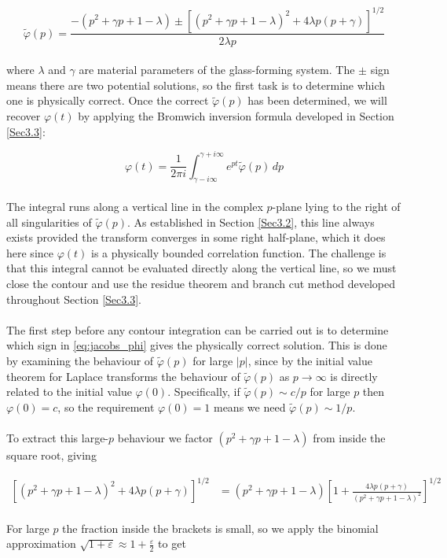 \begin{equation}
    \tilde{\varphi}(p) = \frac{-(p^2 + \gamma p + 1 - \lambda) \pm 
    \left[(p^2 + \gamma p + 1 - \lambda)^2 + 4\lambda p(p+\gamma)\right]^{1/2}}
    {2\lambda p}
    \label{eq:jacobs_phi}
\end{equation}
\\
where $\lambda$ and $\gamma$ are material parameters of the glass-forming system. 
The $\pm$ sign means there are two potential solutions, so the first task is to 
determine which one is physically correct. Once the correct $\tilde{\varphi}(p)$ 
has been determined, we will recover $\varphi(t) $ by applying the Bromwich inversion 
formula developed in Section \ref{Sec3.3}:

\begin{equation}
    \varphi(t) = \frac{1}{2\pi i}\int_{\gamma - i\infty}^{\gamma + i\infty} 
    e^{pt}\tilde{\varphi}(p)\, dp
\end{equation}
\\
The integral runs along a vertical line in the complex $p$-plane lying to the right 
of all singularities of $\tilde{\varphi}(p)$. As established in Section \ref{Sec3.2}, 
this line always exists provided the transform converges in some right half-plane, 
which it does here since $\varphi(t)$ is a physically bounded correlation function. 
The challenge is that this integral cannot be evaluated directly along the vertical 
line, so we must close the contour and use the residue theorem and branch cut 
method developed throughout Section \ref{Sec3.3}.
\\
\\
The first step before any contour integration can be carried out is to determine 
which sign in \eqref{eq:jacobs_phi} gives the physically correct solution. This 
is done by examining the behaviour of $\tilde{\varphi}(p)$ for large $|p|$, since 
by the initial value theorem for Laplace transforms the behaviour of $\tilde{\varphi}(p)$ 
as $p \to \infty$ is directly related to the initial value $\varphi(0)$. 
Specifically, if $\tilde{\varphi}(p) \sim c/p$ for large $p$ then $\varphi(0) = c$, 
so the requirement $\varphi(0) = 1$ means we need $\tilde{\varphi}(p) \sim 1/p$.
\\
\\
To extract this large-$p$ behaviour we factor $(p^2 + \gamma p + 1 - \lambda)$ 
from inside the square root, giving

\begin{align}
    \left[(p^2+\gamma p+1-\lambda)^2 + 4\lambda p(p+\gamma)\right]^{1/2} 
    &= (p^2+\gamma p+1-\lambda)
    \left[1 + \frac{4\lambda p(p+\gamma)}{(p^2+\gamma p+1-\lambda)^2}
    \right]^{1/2}
\end{align}
\\
For large $p$ the fraction inside the brackets is small, so we apply the binomial 
approximation $\sqrt{1+\varepsilon} \approx 1 + \frac{\varepsilon}{2}$ to get

